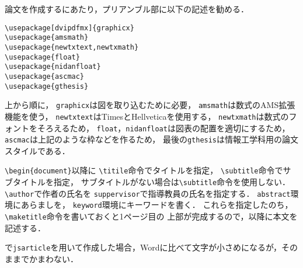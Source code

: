 \documentclass[twocolumn,fleqn]{jsarticle}
\begin{document}
論文を作成するにあたり，プリアンブル部に以下の記述を勧める．
\begin{screen}
\small
\begin{verbatim}
\usepackage[dvipdfmx]{graphicx}
\usepackage{amsmath}
\usepackage{newtxtext,newtxmath}
\usepackage{float}
\usepackage{nidanfloat}
\usepackage{ascmac}
\usepackage{gthesis}
\end{verbatim}
\end{screen}
上から順に，
\verb|graphicx|は図を取り込むために必要，
\verb|amsmath|は数式のAMS拡張機能を使う，
\verb|newtxtext|はTimesと\textsf{Hellvetica}を使用する，
\verb|newtxmath|は数式のフォントをそろえるため，
\verb|float|，\verb|nidanfloat|は図表の配置を適切にするため，
\verb|ascmac|は上記のような枠などを作るため，
最後の\verb|gthesis|は情報工学科用の論文スタイルである．

\verb|\begin{document}|以降に
\verb|\titile|命令でタイトルを指定，
\verb|\subtitle|命令でサブタイトルを指定，
サブタイトルがない場合は\verb|\subtitle|命令を使用しない．
\verb|\author|で作者の氏名を
\verb|suppervisor|で指導教員の氏名を指定する．
\verb|abstract|環境にあらましを，
\verb|keyword|環境にキーワードを書く．
これらを指定したのち，\verb|\maketitle|命令を書いておくと1ページ目の
上部が完成するので，以降に本文を記述する．

\pLaTeX{}で\verb|jsarticle|を用いて作成した場合，Wordに比べて文字が小さめになるが，そのままでかまわない．

\onecolumn
\tableofcontents
\listoffigures
\listoftables
\end{document}
